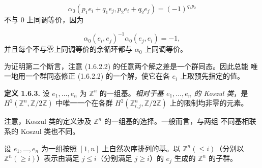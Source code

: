 \begin{equation*}
  \alpha_0(p_1e_i+q_1e_j,p_2e_i+q_2e_j)=(-1)^{q_1p_2}
\end{equation*}
不与 $0$ 上同调等价，因为

\begin{equation*}
  \alpha_0(e_i,e_j)^{-1}\alpha_0(e_j,e_i)=-1,
\end{equation*}
并且每个不与零上同调等价的余循环都与 $\alpha_0$ 上同调等价。

为证明第二个断言，注意 (1.6.2.2) 的任意两个解之差是一个群同态。因此总能
唯一地用一个群同态修正 (1.6.2.2) 的一个解，使它在各 $e_i$ 上取预先指定的值。

\noindent\textbf{定义 1.6.3.}\quad
设 $e_1,\ldots,e_n$ 为 $\mathbb Z^n$ 的一组基。\emph{相对于基
$e_1,\ldots,e_n$ 的 Koszul 类}，是
$H^2(\mathbb Z^n,\mathbb Z/2\mathbb Z)$ 中唯一一个在各群
$H^2(\mathbb Z^n_{i,j},\mathbb Z/2\mathbb Z)$ 上的限制均非零的元素。

注意，Koszul 类的定义涉及 $\mathbb Z^n$ 的一组基的选择。一般而言，与两组
不同基相联系的 Koszul 类也不同。

设 $e_1,\ldots,e_n$ 为一组按照 $[1,n]$ 上自然次序排列的基。以
$\mathbb Z^n(\leq i)$（分别以 $\mathbb Z^n(\geq i)$）表示由满足
$j\leq i$（分别满足 $j\geq i$）的 $e_j$ 生成的 $\mathbb Z^n$ 的子群。
